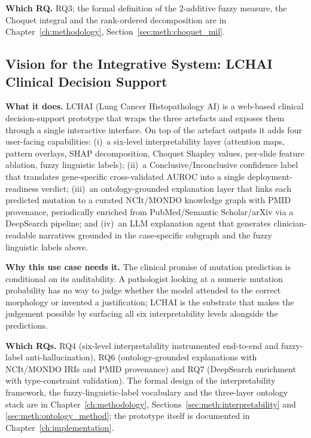 \textbf{Which RQ.}
RQ3; the formal definition of the 2-additive fuzzy measure, the
Choquet integral and the rank-ordered decomposition are in
Chapter~\ref{ch:methodology},
Section~\ref{sec:meth:choquet_mil}.


\subsection{Vision for the Integrative System: LCHAI Clinical Decision Support}
\label{sec:uc:lchai}

\textbf{What it does.}
LCHAI (Lung Cancer Histopathology AI) is a web-based clinical
decision-support prototype that wraps the three artefacts and
exposes them through a single interactive interface.
On top of the artefact outputs it adds four user-facing capabilities:
(i)~a six-level interpretability layer (attention maps, pattern
overlays, SHAP decomposition, Choquet Shapley values, per-slide
feature ablation, fuzzy linguistic labels);
(ii)~a Conclusive/Inconclusive confidence label that translates
gene-specific cross-validated AUROC into a single deployment-readiness
verdict;
(iii)~an ontology-grounded explanation layer that links each predicted
mutation to a curated NCIt/MONDO knowledge graph with PMID provenance,
periodically enriched from PubMed/Semantic Scholar/arXiv via a
DeepSearch pipeline; and
(iv)~an LLM explanation agent that generates clinician-readable
narratives grounded in the case-specific subgraph and the fuzzy
linguistic labels above.

\textbf{Why this use case needs it.}
The clinical promise of mutation prediction is conditional on its
auditability.
A pathologist looking at a numeric mutation probability has no way to
judge whether the model attended to the correct morphology or invented
a justification; LCHAI is the substrate that makes the judgement
possible by surfacing all six interpretability levels alongside the
predictions.

\textbf{Which RQs.}
RQ4 (six-level interpretability instrumented end-to-end and
fuzzy-label anti-hallucination), RQ6 (ontology-grounded explanations
with NCIt/MONDO IRIs and PMID provenance) and RQ7 (DeepSearch
enrichment with type-constraint validation).
The formal design of the interpretability framework, the
fuzzy-linguistic-label vocabulary and the three-layer ontology stack
are in Chapter~\ref{ch:methodology},
Sections~\ref{sec:meth:interpretability} and
\ref{sec:meth:ontology_method};
the prototype itself is documented in
Chapter~\ref{ch:implementation}.

